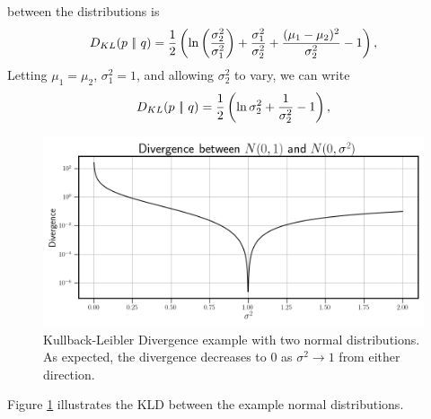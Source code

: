 between the distributions is
\begin{equation}
    D_{KL}(p\ |\!|\ q) = \frac{1}{2}\parens{\ln\parens{\frac{\sigma_2^2}{\sigma_1^2}} + 
    \frac{\sigma_1^2}{\sigma_2^2} + \frac{(\mu_1 - \mu_2)^2}{\sigma_2^2} - 1}, \label{eqn:normal divergence}
\end{equation}
Letting $\mu_1 = \mu_2$, $\sigma_1^2 = 1$, and allowing $\sigma_2^2$ to vary, we can 
write 
\begin{equation}
    D_{KL}(p\ |\!|\ q) = \frac{1}{2}\left(\ln\sigma_2^2 + 
    \frac{1}{\sigma_2^2} - 1\right), \label{eqn:normal divergence2}
\end{equation}
\begin{figure}[ht]
    \centering
    \begin{minipage}{\textwidth}
        \includegraphics[width=\textwidth]{Figures/divergence_example.png}
    \end{minipage} 
    \caption{Kullback-Leibler Divergence example with two normal distributions. As expected, the divergence 
    decreases to 0 as $\sigma^2 \to 1$ from either direction.}
    \label{fig:divergence example}
\end{figure}
Figure \ref{fig:divergence example} illustrates the KLD between the example normal distributions.

